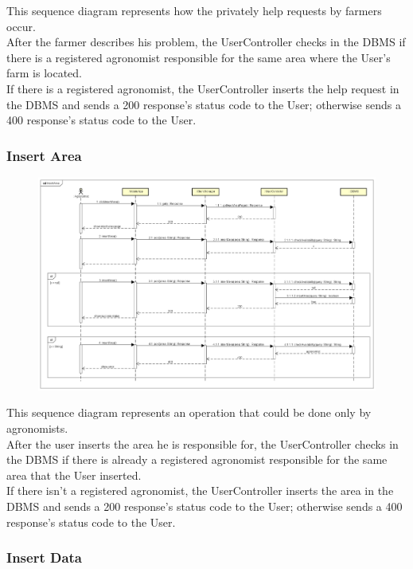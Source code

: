 This sequence diagram represents how the privately help requests by farmers occur.\\
After the farmer describes his problem, the UserController checks in the DBMS if there 
is a registered agronomist responsible for the same area where the User's farm is located.\\
If there is a registered agronomist, the UserController inserts the help request in the DBMS and sends 
a 200 response's status code to the User; otherwise sends a 400 response's status code to the User.


\newpage
\subsubsection{Insert Area}

\begin{figure}[H]
    \begin{center}
        \includegraphics[width=\textwidth]{Images/SequenceDiagrams/InsertAreaDD.png}
    \end{center}
\end{figure}

This sequence diagram represents an operation that could be done only by agronomists.\\
After the user inserts the area he is responsible for, the UserController checks in the 
DBMS if there is already a registered agronomist responsible for the same area that the User inserted.\\
If there isn't a registered agronomist, the UserController inserts the area in the DBMS and sends a 200 
response's status code to the User; otherwise sends a 400 response's status code to the User.


\newpage
\subsubsection{Insert Data}

